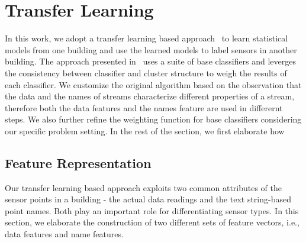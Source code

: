\section{Transfer Learning}
In this work, we adopt a transfer learning based approach~\cite{lwe} to learn statistical models from 
one building and use the learned models to label sensors in another building.
The approach presented in~\cite{lwe} uses a suite of base classifiers and leverges the consistency between classifier and cluster structure 
to weigh the results of each classifier.
We customize the original algorithm based on the observation that the data and the names of streams characterize different properties of a stream, therefore both the data features and the names feature are used in differernt steps. We also further refine the weighting function for base classifiers considering our specific problem setting.
In the rest of the section, we first elaborate how

\subsection{Feature Representation}\label{feature}
Our transfer learning based approach exploits two common attributes of the sensor points in a building - the actual data readings and the text string-based point names. 
Both play an important role for differentiating sensor types.
In this section, we elaborate the construction of two different sets of feature vectors, i.e., data features and name features.

